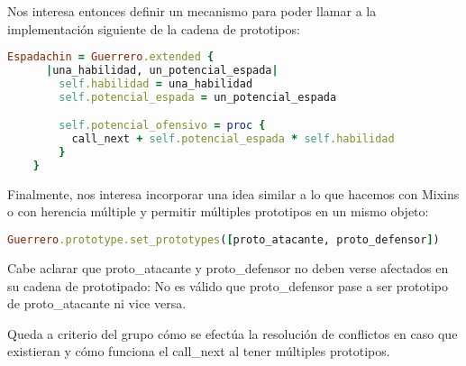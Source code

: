 \documentclass[spanish,a4paper]{article}
\begin{document}
Nos interesa entonces definir un mecanismo para poder llamar a la implementación siguiente de la cadena de prototipos:
\begin{lstlisting}[language=Ruby]
	Espadachin = Guerrero.extended {
	  |una_habilidad, un_potencial_espada|
		self.habilidad = una_habilidad
		self.potencial_espada = un_potencial_espada

		self.potencial_ofensivo = proc {
		  call_next + self.potencial_espada * self.habilidad
		}
	}
\end{lstlisting}
Finalmente, nos interesa incorporar una idea similar a lo que hacemos con Mixins o con herencia múltiple y permitir múltiples prototipos en un mismo objeto:
\begin{lstlisting}[language=Ruby]
	Guerrero.prototype.set_prototypes([proto_atacante, proto_defensor])
\end{lstlisting}
Cabe aclarar que proto\_atacante y proto\_defensor no deben verse afectados en su cadena de prototipado: No es válido que proto\_defensor pase a ser prototipo de proto\_atacante ni vice versa.

\bigskip

Queda a criterio del grupo cómo se efectúa la resolución de conflictos en caso que existieran y cómo funciona el call\_next al tener múltiples prototipos.
\end{document}
